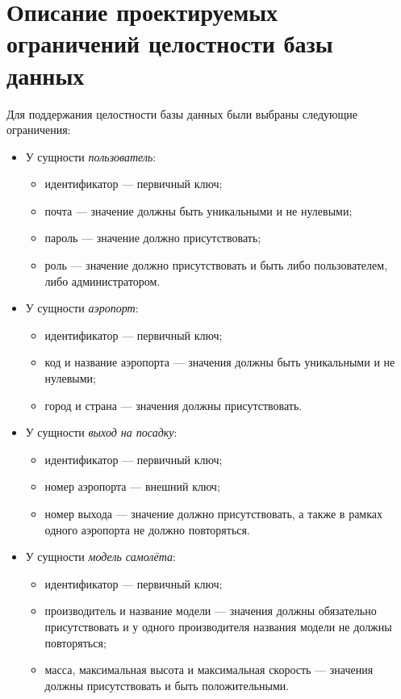 \section{Описание проектируемых ограничений целостности базы данных}
Для поддержания целостности базы данных были выбраны следующие ограничения:
\begin{itemize}
	\item У сущности \textit{пользователь}:
	\begin{itemize}
		\item идентификатор --- первичный ключ;
		\item почта --- значение должны быть уникальными и не нулевыми;
		\item пароль --- значение должно присутствовать;
		\item роль --- значение должно присутствовать и быть либо пользователем, либо администратором.
	\end{itemize}

	\item У сущности \textit{аэропорт}:
	\begin{itemize}
		\item идентификатор --- первичный ключ;
		\item код и название аэропорта --- значения должны быть уникальными и не нулевыми;
		\item город и страна --- значения должны присутствовать.
	\end{itemize}

	\item У сущности \textit{выход на посадку}:
	\begin{itemize}
		\item идентификатор --- первичный ключ;
		\item номер аэропорта --- внешний ключ;
		\item номер выхода --- значение должно присутствовать, а также в рамках одного аэропорта не должно повторяться.
	\end{itemize}

	\item У сущности \textit{модель самолёта}:
	\begin{itemize}
		\item идентификатор --- первичный ключ;
		\item производитель и название модели --- значения должны обязательно присутствовать и у одного производителя названия модели не должны повторяться;
		\item масса, максимальная высота и максимальная скорость --- значения должны присутствовать и быть положительными.
	\end{itemize}


\end{itemize}
